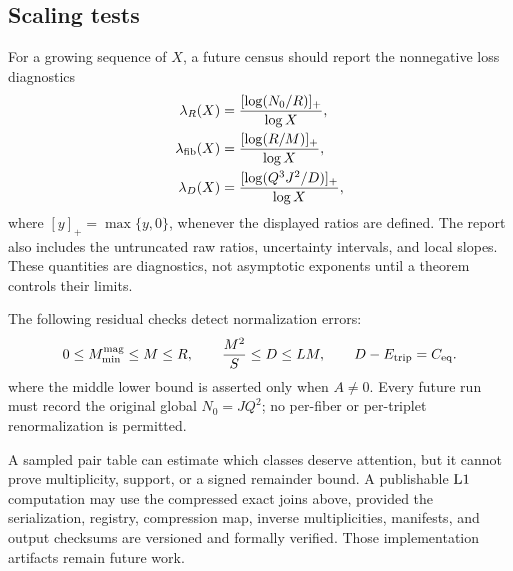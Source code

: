 \subsection{Scaling tests}

For a growing sequence of \(X\), a future census should report the
nonnegative loss diagnostics
\begin{align}
 \lambda_R(X)&=
 \frac{[\log(N_0/R)]_+}{\log X},
\label{eq:empirical-raw-loss}\\
 \lambda_{\rm fib}(X)&=
 \frac{[\log(R/M)]_+}{\log X},
\label{eq:empirical-fiber-loss}\\
 \lambda_D(X)&=
 \frac{[\log(Q^3J^2/D)]_+}{\log X},
\label{eq:empirical-energy-loss}
\end{align}
where \([y]_+=\max\{y,0\}\), whenever the displayed ratios are
defined.  The report also includes the untruncated raw ratios,
uncertainty intervals, and local slopes.  These quantities are
diagnostics, not asymptotic exponents until a theorem controls their
limits.

The following residual checks detect normalization errors:
\begin{equation}
 0\le M_{\min}^{\rm mag}\le M\le R,\qquad
 \frac{M^2}{S}\le D\le LM,\qquad
 D-E_{\mathrm{trip}}=C_{\mathrm{eq}}.
\label{eq:census-invariants}
\end{equation}
where the middle lower bound is asserted only when \(A\ne0\).
Every future run must record the original global \(N_0=JQ^2\); no
per-fiber or per-triplet renormalization is permitted.

\begin{remark}
A sampled pair table can estimate which classes deserve attention,
but it cannot prove multiplicity, support, or a signed remainder
bound.  A publishable \(\mathrm{L1}\) computation may use the compressed
exact joins above, provided the serialization, registry, compression
map, inverse multiplicities, manifests, and output checksums are
versioned and formally verified.  Those implementation artifacts
remain future work.
\end{remark}
